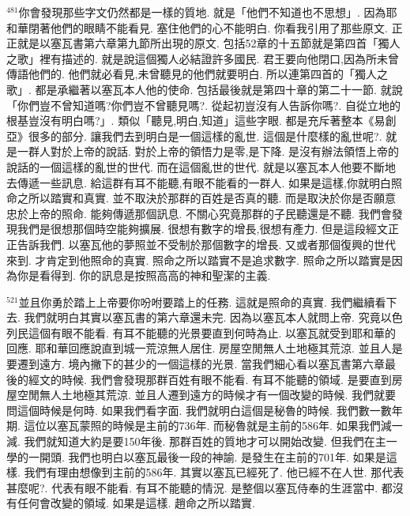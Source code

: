 \documentclass{book}
\begin{document}
$^{481}$你會發現那些字文仍然都是一樣的質地.
就是「他們不知道也不思想」.
因為耶和華閉著他們的眼睛不能看見.
塞住他們的心不能明白.
你看我引用了那些原文.
正正就是以塞瓦書第六章第九節所出現的原文.
包括52章的十五節就是第四首「獨人之歌」裡有描述的.
就是說這個獨人必結證許多國民.
君王要向他閉口,因為所未曾傳語他們的.
他們就必看見,未曾聽見的他們就要明白.
所以連第四首的「獨人之歌」.
都是承繼著以塞瓦本人他的使命.
包括最後就是第四十章的第二十一節.
就說「你們豈不曾知道嗎?你們豈不曾聽見嗎?.
從起初豈沒有人告訴你嗎?.
自從立地的根基豈沒有明白嗎?」.
類似「聽見,明白,知道」這些字眼.
都是充斥著整本《易創亞》很多的部分.
讓我們去到明白是一個這樣的亂世.
這個是什麼樣的亂世呢?.
就是一群人對於上帝的說話.
對於上帝的領悟力是零,是下降.
是沒有辦法領悟上帝的說話的一個這樣的亂世的世代.
而在這個亂世的世代.
就是以塞瓦本人他要不斷地去傳遞一些訊息.
給這群有耳不能聽,有眼不能看的一群人.
如果是這樣,你就明白照命之所以踏實和真實.
並不取決於那群的百姓是否真的聽.
而是取決於你是否願意忠於上帝的照命.
能夠傳遞那個訊息.
不關心究竟那群的子民聽還是不聽.
我們會發現我們是很想那個時空能夠擴展.
很想有數字的增長,很想有產力.
但是這段經文正正告訴我們.
以塞瓦他的夢照並不受制於那個數字的增長.
又或者那個復興的世代來到.
才肯定到他照命的真實.
照命之所以踏實不是追求數字.
照命之所以踏實是因為你是看得到.
你的訊息是按照高高的神和聖潔的主義.

$^{521}$並且你勇於踏上上帝要你吩咐要踏上的任務.
這就是照命的真實.
我們繼續看下去.
我們就明白其實以塞瓦書的第六章還未完.
因為以塞瓦本人就問上帝.
究竟以色列民這個有眼不能看.
有耳不能聽的光景要直到何時為止.
以塞瓦就受到耶和華的回應.
耶和華回應說直到城一荒涼無人居住.
房屋空閒無人土地極其荒涼.
並且人是要遷到遠方.
境內撇下的甚少的一個這樣的光景.
當我們細心看以塞瓦書第六章最後的經文的時候.
我們會發現那群百姓有眼不能看.
有耳不能聽的領域.
是要直到房屋空閒無人土地極其荒涼.
並且人遷到遠方的時候才有一個改變的時候.
我們就要問這個時候是何時.
如果我們看字面.
我們就明白這個是秘魯的時候.
我們數一數年期.
這位以塞瓦蒙照的時候是主前的736年.
而秘魯就是主前的586年.
如果我們減一減.
我們就知道大約是要150年後.
那群百姓的質地才可以開始改變.
但我們在主一學的一開頭.
我們也明白以塞瓦最後一段的神諭.
是發生在主前的701年.
如果是這樣.
我們有理由想像到主前的586年.
其實以塞瓦已經死了.
他已經不在人世.
那代表甚麼呢?.
代表有眼不能看.
有耳不能聽的情況.
是整個以塞瓦侍奉的生涯當中.
都沒有任何會改變的領域.
如果是這樣.
趙命之所以踏實.
\end{document}
